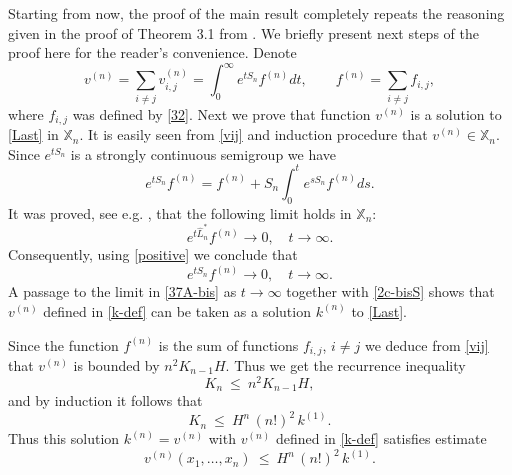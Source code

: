 \documentclass[a4paper,12pt]{article}
\newcommand{\XX}{{\mathbb X}}
\begin{document}
Starting from now, the proof of the main result completely repeats the reasoning given in the proof of Theorem 3.1 from \cite{PZ-EJP}. We briefly present next steps of the proof here for the reader's convenience.
Denote
\begin{equation}\label{k-def}
v^{(n)}  = \sum_{i \neq j} v^{(n)}_{i,j}=\int_0^{\infty} e^{t S_n} f^{(n)} dt, \qquad f^{(n)} = \sum_{i \neq j} f_{i,j},
\end{equation}
where $f_{i,j}$ was defined by \eqref{32}.
Next we prove that function $v^{(n)}$ is  a solution to \eqref{Last} in $\XX_{n}$.
It is easily seen from \eqref{vij} and induction procedure that $v^{(n)}\in\XX_{n}$. Since $e^{t S_n}$ is a strongly continuous semigroup we have
\begin{equation}\label{37A-bis}
e^{t S_n}f^{(n)} = f^{(n)} + S_n \int_{0}^{t}e^{s S_n}f^{(n)}ds.
\end{equation}
It was proved, see e.g. \cite{PZ-EJP}, that
the following limit holds in $\XX_{n}$:
\begin{equation}\label{2c-bis}
 e^{t \hat L_n^{\ast}}f^{(n)} \to 0, \quad t\to \infty.
\end{equation}
Consequently, using \eqref{positive} we conclude that
\begin{equation}\label{2c-bisS}
 e^{t S_n}f^{(n)} \to 0, \quad t\to \infty.
\end{equation}
A passage to the limit in \eqref{37A-bis}  as $t\to\infty$ together with \eqref{2c-bisS} shows  that $v^{(n)}$ defined in \eqref{k-def} can be taken as a solution $k^{(n)}$ to \eqref{Last}.


Since the function $f^{(n)}$ is the sum
of functions $f_{i,j}$, $i\neq j$ we deduce from \eqref{vij} that $ v^{(n)}$
is bounded by $n^2  K_{n-1} H$. Thus we get the recurrence inequality
\begin{equation}\label{50}
K_n \ \le \ n^2 K_{n-1} H,
\end{equation}
and by induction it follows that
\begin{equation}\label{49}
K_n \ \le \ H^n \, (n!)^2 \, k^{(1)}.
\end{equation}
Thus this solution $k^{(n)} = v^{(n)}$ with $v^{(n)}$ defined in \eqref{k-def} satisfies estimate
\begin{equation}\label{49A}
v^{(n)} (x_1, \ldots, x_n) \ \le \ H^n \, (n!)^2 \,  k^{(1)}.
\end{equation}
\end{document}
